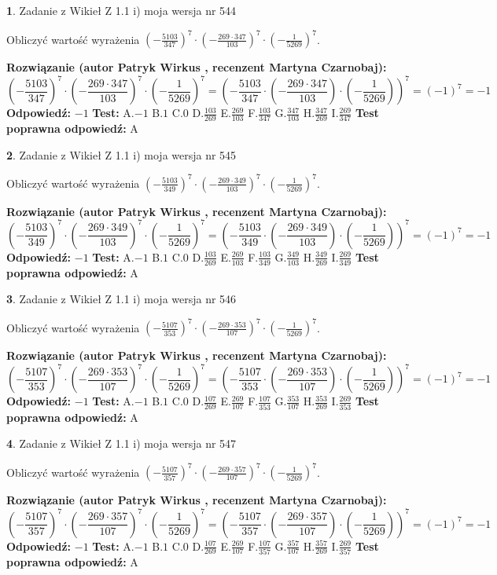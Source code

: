\documentclass[12pt, a4paper]{article}
\theoremstyle{definition} %
\newtheorem{zad}{}
\newcommand{\zadStart}[1]{\begin{zad}#1\newline}
\newcommand{\zadStop}{\end{zad}}
\newcommand{\rozwStart}[2]{\noindent \textbf{Rozwiązanie (autor #1 , recenzent #2): }\newline}
\newcommand{\rozwStop}{\newline}
\newcommand{\odpStart}{\noindent \textbf{Odpowiedź:}\newline}
\newcommand{\odpStop}{\newline}
\newcommand{\testStart}{\noindent \textbf{Test:}\newline}
\newcommand{\testStop}{\newline}
\newcommand{\kluczStart}{\noindent \textbf{Test poprawna odpowiedź:}\newline}
\newcommand{\kluczStop}{\newline}
\begin{document}
\zadStart{Zadanie z Wikieł Z 1.1 i) moja wersja nr 544}

Obliczyć wartość wyrażenia $(-\frac{5103}{347})^{7} \cdot (-\frac{269 \cdot 347}{103})^{7} \cdot (-\frac{1}{5269})^{7}$.
\zadStop
\rozwStart{Patryk Wirkus}{Martyna Czarnobaj}
$$(-\frac{5103}{347})^{7} \cdot (-\frac{269 \cdot 347}{103})^{7} \cdot (-\frac{1}{5269})^{7} = (-\frac{5103}{347} \cdot (-\frac{269 \cdot 347}{103}) \cdot (-\frac{1}{5269}))^{7} = (-1)^{7} = -1$$
\rozwStop
\odpStart
$-1$
\odpStop
\testStart
A.$-1$ B.$1$ C.$0$ D.$\frac{103}{269}$ E.$\frac{269}{103}$
F.$\frac{103}{347}$ G.$\frac{347}{103}$
H.$\frac{347}{269}$
I.$\frac{269}{347}$
\testStop
\kluczStart
A
\kluczStop



\zadStart{Zadanie z Wikieł Z 1.1 i) moja wersja nr 545}

Obliczyć wartość wyrażenia $(-\frac{5103}{349})^{7} \cdot (-\frac{269 \cdot 349}{103})^{7} \cdot (-\frac{1}{5269})^{7}$.
\zadStop
\rozwStart{Patryk Wirkus}{Martyna Czarnobaj}
$$(-\frac{5103}{349})^{7} \cdot (-\frac{269 \cdot 349}{103})^{7} \cdot (-\frac{1}{5269})^{7} = (-\frac{5103}{349} \cdot (-\frac{269 \cdot 349}{103}) \cdot (-\frac{1}{5269}))^{7} = (-1)^{7} = -1$$
\rozwStop
\odpStart
$-1$
\odpStop
\testStart
A.$-1$ B.$1$ C.$0$ D.$\frac{103}{269}$ E.$\frac{269}{103}$
F.$\frac{103}{349}$ G.$\frac{349}{103}$
H.$\frac{349}{269}$
I.$\frac{269}{349}$
\testStop
\kluczStart
A
\kluczStop



\zadStart{Zadanie z Wikieł Z 1.1 i) moja wersja nr 546}

Obliczyć wartość wyrażenia $(-\frac{5107}{353})^{7} \cdot (-\frac{269 \cdot 353}{107})^{7} \cdot (-\frac{1}{5269})^{7}$.
\zadStop
\rozwStart{Patryk Wirkus}{Martyna Czarnobaj}
$$(-\frac{5107}{353})^{7} \cdot (-\frac{269 \cdot 353}{107})^{7} \cdot (-\frac{1}{5269})^{7} = (-\frac{5107}{353} \cdot (-\frac{269 \cdot 353}{107}) \cdot (-\frac{1}{5269}))^{7} = (-1)^{7} = -1$$
\rozwStop
\odpStart
$-1$
\odpStop
\testStart
A.$-1$ B.$1$ C.$0$ D.$\frac{107}{269}$ E.$\frac{269}{107}$
F.$\frac{107}{353}$ G.$\frac{353}{107}$
H.$\frac{353}{269}$
I.$\frac{269}{353}$
\testStop
\kluczStart
A
\kluczStop



\zadStart{Zadanie z Wikieł Z 1.1 i) moja wersja nr 547}

Obliczyć wartość wyrażenia $(-\frac{5107}{357})^{7} \cdot (-\frac{269 \cdot 357}{107})^{7} \cdot (-\frac{1}{5269})^{7}$.
\zadStop
\rozwStart{Patryk Wirkus}{Martyna Czarnobaj}
$$(-\frac{5107}{357})^{7} \cdot (-\frac{269 \cdot 357}{107})^{7} \cdot (-\frac{1}{5269})^{7} = (-\frac{5107}{357} \cdot (-\frac{269 \cdot 357}{107}) \cdot (-\frac{1}{5269}))^{7} = (-1)^{7} = -1$$
\rozwStop
\odpStart
$-1$
\odpStop
\testStart
A.$-1$ B.$1$ C.$0$ D.$\frac{107}{269}$ E.$\frac{269}{107}$
F.$\frac{107}{357}$ G.$\frac{357}{107}$
H.$\frac{357}{269}$
I.$\frac{269}{357}$
\testStop
\kluczStart
A
\kluczStop
\end{document}
